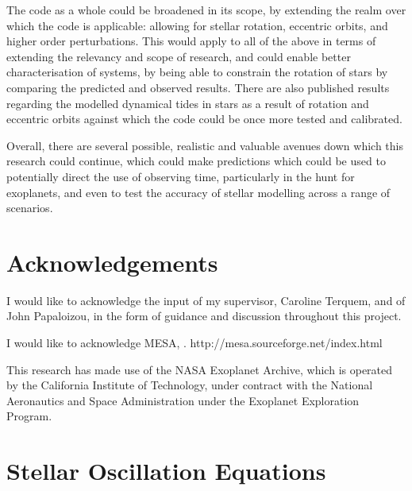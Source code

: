 \documentclass[11pt]{amsart}
\begin{document}
The code as a whole could be broadened in its scope, by extending the realm over which the code is applicable: allowing for stellar rotation, eccentric orbits, and higher order perturbations.  This would apply to all of the above in terms of extending the relevancy and scope of research, and could enable better characterisation of systems, by being able to constrain the rotation of stars by comparing the predicted and observed results.  There are also published results regarding the modelled dynamical tides in stars as a result of rotation and eccentric orbits \cite{Burkart2012} against which the code could be once more tested and calibrated.

Overall, there are several possible, realistic and valuable avenues down which this research could continue, which could make predictions which could be used to potentially direct the use of observing time, particularly in the hunt for exoplanets, and even to test the accuracy of stellar modelling across a range of scenarios.









\section{Acknowledgements}  \label{Acknowledgements}

I would like to acknowledge the input of my supervisor, Caroline Terquem,  and of John Papaloizou, in the form of guidance and discussion throughout this project.

I would like to acknowledge MESA, \cite{Paxton2011}. http://mesa.sourceforge.net/index.html

This research has made use of the NASA Exoplanet Archive, which is operated by the California Institute of Technology, under contract with the National Aeronautics and Space Administration under the Exoplanet Exploration Program.
















\newpage

\appendix

\section{Stellar Oscillation Equations} \label{ap:Osc}
\end{document}
